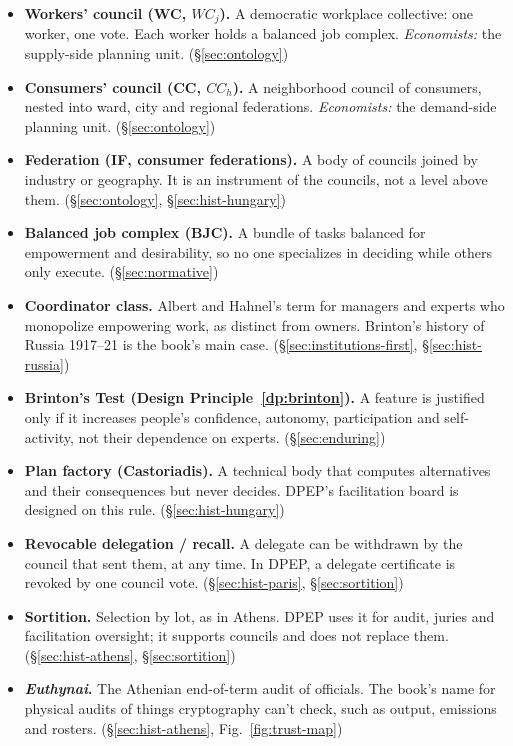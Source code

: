 \documentclass[10pt,twoside,openany]{book}
\theoremstyle{dpepstyle}
\begin{document}
\begin{itemize}[leftmargin=1.2em,itemsep=2pt,topsep=2pt]
\item \textbf{Workers' council (WC, $WC_j$).} A democratic workplace collective: one worker, one vote. Each worker holds a balanced job complex. \emph{Economists:} the supply-side planning unit. (\S\ref{sec:ontology})
\item \textbf{Consumers' council (CC, $CC_h$).} A neighborhood council of consumers, nested into ward, city and regional federations. \emph{Economists:} the demand-side planning unit. (\S\ref{sec:ontology})
\item \textbf{Federation (IF, consumer federations).} A body of councils joined by industry or geography. It is an instrument of the councils, not a level above them. (\S\ref{sec:ontology}, \S\ref{sec:hist-hungary})
\item \textbf{Balanced job complex (BJC).} A bundle of tasks balanced for empowerment and desirability, so no one specializes in deciding while others only execute. (\S\ref{sec:normative})
\item \textbf{Coordinator class.} Albert and Hahnel's term for managers and experts who monopolize empowering work, as distinct from owners. Brinton's history of Russia 1917--21 is the book's main case. (\S\ref{sec:institutions-first}, \S\ref{sec:hist-russia})
\item \textbf{Brinton's Test (Design Principle~\ref{dp:brinton}).} A feature is justified only if it increases people's confidence, autonomy, participation and self-activity, not their dependence on experts. (\S\ref{sec:enduring})
\item \textbf{Plan factory (Castoriadis).} A technical body that computes alternatives and their consequences but never decides. DPEP's facilitation board is designed on this rule. (\S\ref{sec:hist-hungary})
\item \textbf{Revocable delegation / recall.} A delegate can be withdrawn by the council that sent them, at any time. In DPEP, a delegate certificate is revoked by one council vote. (\S\ref{sec:hist-paris}, \S\ref{sec:sortition})
\item \textbf{Sortition.} Selection by lot, as in Athens. DPEP uses it for audit, juries and facilitation oversight; it supports councils and does not replace them. (\S\ref{sec:hist-athens}, \S\ref{sec:sortition})
\item \textbf{\emph{Euthynai}.} The Athenian end-of-term audit of officials. The book's name for physical audits of things cryptography can't check, such as output, emissions and rosters. (\S\ref{sec:hist-athens}, Fig.~\ref{fig:trust-map})

\end{itemize}
\end{document}
